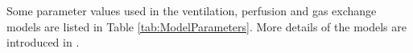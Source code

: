 %
%
%
%
%

Some parameter values used in the ventilation, perfusion and gas exchange models are listed in Table \ref{tab:ModelParameters}. More details of the models are introduced in \cite{swan2010evidence, swan2010multi,clark2011interdependent,swan2012computational}.


